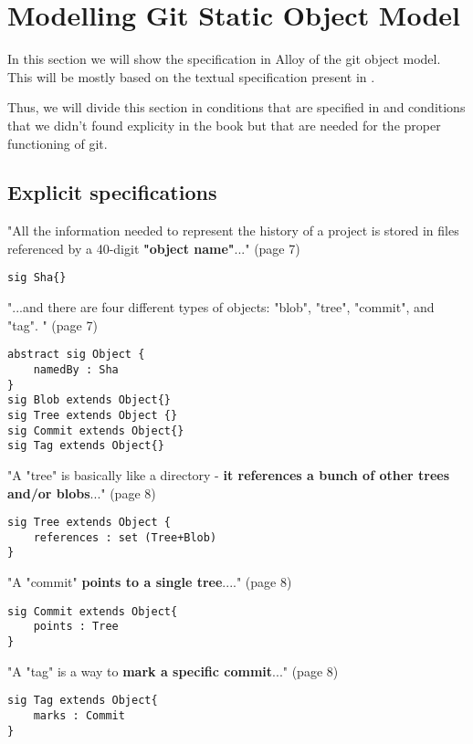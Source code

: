\section{Modelling Git Static Object Model}

In this section we will show the specification in Alloy of the
git object model. This will be mostly based on the textual
specification present in \cite{gitComm}. \par
Thus, we will divide this section in conditions that are specified 
in \cite{gitComm} and conditions that we didn't found explicity
in the book but that are needed for the proper functioning of
git.

\subsection{Explicit specifications}

"All the information needed to represent the history
of a project is stored in files referenced by a 
40-digit {\bf "object name"}..." (page 7)

\begin{lstlisting}
sig Sha{}
\end{lstlisting}

"...and there are four different types of objects: "blob",
"tree", "commit", and "tag". " (page 7)

\begin{lstlisting}
abstract sig Object {
	namedBy : Sha
}
sig Blob extends Object{}
sig Tree extends Object {}
sig Commit extends Object{}
sig Tag extends Object{}
\end{lstlisting}

"A "tree" is basically like a directory - {\bf it references a bunch
of other trees and/or blobs}..." (page 8)

\begin{lstlisting}
sig Tree extends Object {
	references : set (Tree+Blob)
}
\end{lstlisting}

"A "commit" {\bf points to a single tree}...." (page 8)

\begin{lstlisting}
sig Commit extends Object{
	points : Tree
}
\end{lstlisting}

"A "tag" is a way to { \bf mark a specific commit}..." (page 8)

\begin{lstlisting}
sig Tag extends Object{
	marks : Commit
}
\end{lstlisting}

